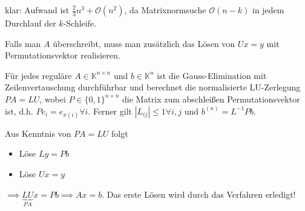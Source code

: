 \begin{remark}
	klar: Aufwand ist $\frac{2}{3}n^3 + \mathcal{O}(n^2)$, da Matrixnormsuche $\mathcal{O}(n-k)$ in jedem Durchlauf der $k$-Schleife.
\end{remark}

\begin{remark}
	Falls man $A$ überschreibt, muss man zusätzlich das Lösen von $Ux=y$ mit Permutationsvektor realisieren.
\end{remark}

\begin{theorem}
	Für jedes reguläre $A \in \mathbb{K}^{n\times n}$ und $b \in \mathbb{K}^n$ ist die Gauss-Elimination mit Zeilenvertauschung durchführbar und berechnet die normalisierte LU-Zerlegung $PA=LU$, wobei $P \in \{0, 1\}^{n \times n}$ die Matrix zum abschleißen Permutationsvektor ist, d.h. $Pe_i = e_{\pi(i)} \forall i$. Ferner gilt $|L_{ij}| \leq 1 \forall i,j$ und $b^{(n)} = L^{-1}Pb$.
\end{theorem}

\begin{remark}
	Aus Kenntnis von $PA=LU$ folgt
	\begin{itemize}
		\item Löse $Ly = Pb$
		\item Löse $Ux = y$
	\end{itemize}
	$\implies \underbrace{LU}_{PA}x = Pb \implies Ax=b$. Das erste Lösen wird durch das Verfahren erledigt!
\end{remark}

